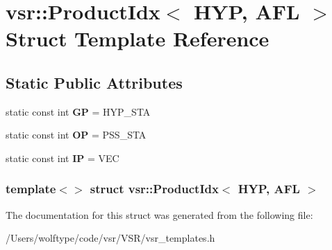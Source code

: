 \hypertarget{structvsr_1_1_product_idx_3_01_h_y_p_00_01_a_f_l_01_4}{\section{vsr\-:\-:Product\-Idx$<$ H\-Y\-P, A\-F\-L $>$ Struct Template Reference}
\label{structvsr_1_1_product_idx_3_01_h_y_p_00_01_a_f_l_01_4}
}
\subsection*{Static Public Attributes}
\begin{DoxyCompactItemize}
\item 
\hypertarget{structvsr_1_1_product_idx_3_01_h_y_p_00_01_a_f_l_01_4_a20f2da57c2e680d5dc2a1683e6f01fbc}{static const int {\bfseries G\-P} = H\-Y\-P\-\_\-\-S\-T\-A}\label{structvsr_1_1_product_idx_3_01_h_y_p_00_01_a_f_l_01_4_a20f2da57c2e680d5dc2a1683e6f01fbc}

\item 
\hypertarget{structvsr_1_1_product_idx_3_01_h_y_p_00_01_a_f_l_01_4_ad3f02944c9d511186d9cc1aca825c914}{static const int {\bfseries O\-P} = P\-S\-S\-\_\-\-S\-T\-A}\label{structvsr_1_1_product_idx_3_01_h_y_p_00_01_a_f_l_01_4_ad3f02944c9d511186d9cc1aca825c914}

\item 
\hypertarget{structvsr_1_1_product_idx_3_01_h_y_p_00_01_a_f_l_01_4_aaef7d5cc5c01d9c8b4f3bbc1ef062a8a}{static const int {\bfseries I\-P} = V\-E\-C}\label{structvsr_1_1_product_idx_3_01_h_y_p_00_01_a_f_l_01_4_aaef7d5cc5c01d9c8b4f3bbc1ef062a8a}

\end{DoxyCompactItemize}
\subsubsection*{template$<$$>$ struct vsr\-::\-Product\-Idx$<$ H\-Y\-P, A\-F\-L $>$}



The documentation for this struct was generated from the following file\-:\begin{DoxyCompactItemize}
\item 
/\-Users/wolftype/code/vsr/\-V\-S\-R/vsr\-\_\-templates.\-h\end{DoxyCompactItemize}
